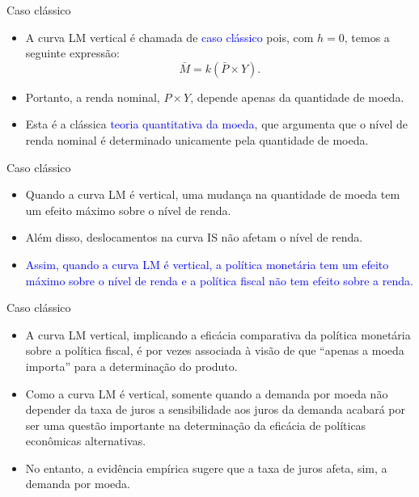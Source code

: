 \documentclass[10pt]{beamer}
\begin{document}
\begin{frame}{Caso clássico}
\begin{itemize}
    \item A curva LM vertical é chamada de \textcolor{blue}{caso clássico} pois, com $h = 0$, temos a seguinte expressão:
    \begin{equation}
        \bar{M} = k(\bar{P}\times Y). \label{eq6}
    \end{equation}
    \bigskip
    \item Portanto, a renda nominal, $P \times Y$, depende apenas da quantidade de moeda.
    \bigskip
    \item Esta é a clássica \textcolor{blue}{teoria quantitativa da moeda}, que argumenta que o nível de renda nominal é determinado unicamente pela quantidade de moeda.
\end{itemize}
\end{frame}

\begin{frame}{Caso clássico}
\begin{itemize}
    \item Quando a curva LM é vertical, uma mudança na quantidade de moeda tem um efeito máximo sobre o nível de renda.
    \bigskip
    \item Além disso, deslocamentos na curva IS não afetam o nível de renda.
    \bigskip
    \item \textcolor{blue}{Assim, quando a curva LM é vertical, a política monetária tem um efeito máximo sobre o nível de renda e a política fiscal não tem efeito sobre a renda}.
\end{itemize}
\end{frame}

\begin{frame}{Caso clássico}
\begin{itemize}
    \item A curva LM vertical, implicando a eficácia comparativa da política monetária sobre a política fiscal, é por vezes associada à visão de que ``apenas a moeda importa'' para a determinação do produto.
    \bigskip
    \item Como a curva LM é vertical, somente quando a demanda por moeda não depender da taxa de juros a sensibilidade aos juros da demanda acabará por ser uma questão importante na determinação da eficácia de políticas econômicas alternativas.
    \bigskip
    \item No entanto, a evidência empírica sugere que a taxa de juros afeta, sim, a demanda por moeda.
\end{itemize}
\end{frame}
\end{document}
